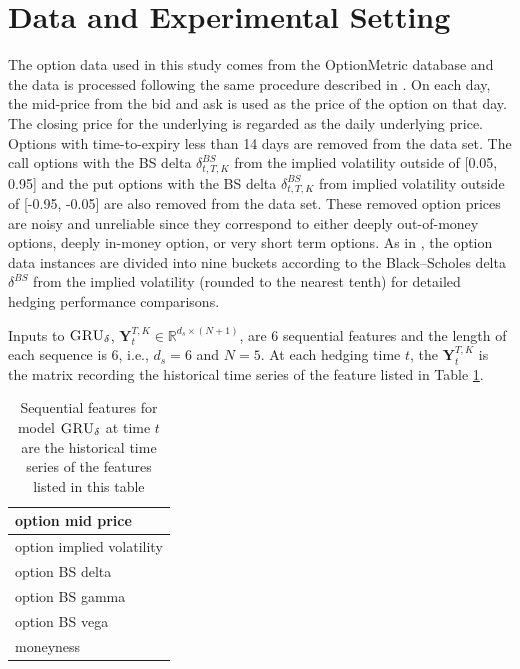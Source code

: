 \documentclass[letterpaper,12pt,titlepage,oneside,final]{book}
\numberwithin{equation}{section}
\theoremstyle{definition}
\newcommand{\model}{\textsc{GRU}_\delta}
\newcommand{\Real}{\mathbb{R}}
\begin{document}
\section{Data and Experimental Setting}
The option data used in this study comes from the OptionMetric database  and the data is processed following the same procedure described in \cite{hulloptimal}.
On each day, the mid-price from the bid and ask is used as the price of the option on that day. The closing price for the underlying is regarded as the daily underlying price.
Options with time-to-expiry less than 14 days are removed from the data set.  The call options  with the  BS delta $\delta^{BS}_{t,T,K}$ from the implied volatility outside of  [0.05, 0.95]  and the put options with the  BS delta $\delta^{BS}_{t,T,K}$ from implied volatility outside of [-0.95, -0.05] are also removed from the data set. These removed option prices are noisy and unreliable since they correspond to either deeply out-of-money options, deeply in-money option, or very short term options.
As in \cite{hulloptimal},  the option data instances are divided into nine buckets according to the Black–Scholes delta $\delta^{BS}$ from the implied volatility (rounded to the nearest tenth) for  detailed hedging performance comparisons.


Inputs to $\model$, $\mathbf{Y}_{t}^{T,K} \in \Real^{d_s \times (N+1)}$, are  6  sequential features and the length of each sequence is 6, i.e., $d_s=6$ and $N=5$. At each hedging time $t$, the $\mathbf{Y}_{t}^{T,K}$ is  the matrix recording the historical time series of the feature listed in Table \ref{table:SeqForLocal}.
\begin{table}[htp!]
	\centering
	\begin{tabular}{|l|}
		\hline
		option mid price\\ \hline
		option implied volatility\\ 
		\hline
		option BS delta\\
		\hline
		option BS gamma\\
		\hline
		option BS vega\\
		\hline
		moneyness\\
		\hline
	\end{tabular}
	\label{table:SeqForLocal}
	\caption{Sequential features for model $\model$ at time $t$ are the historical time series of the features listed in this table}
\end{table}
\end{document}
